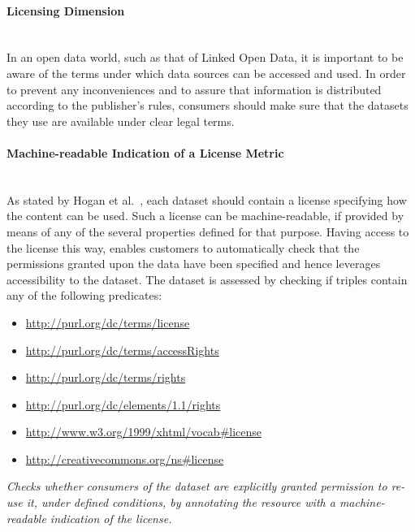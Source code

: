 
\paragraph{Licensing Dimension}~\\ %
In an open data world, such as that of Linked Open Data, it is important to be aware of the terms under which data sources can be accessed and used. In order to prevent any inconveniences and to assure that information is distributed according to the publisher's rules, consumers should make sure that the datasets they use are available under clear legal terms.

\paragraph{Machine-readable Indication of a License Metric} ~\\ %
As stated by Hogan et al.~\cite{Hogan2012:LDC}, each dataset should contain a license specifying how the content can be used. Such a license can be machine-readable, if provided by means of any of the several properties defined for that purpose. Having access to the license this way, enables customers to automatically check that the permissions granted upon the data have been specified and hence leverages accessibility to the dataset.
The dataset is assessed by checking if triples contain any of the following predicates:
\begin{itemize}
\item \url{http://purl.org/dc/terms/license}
\item \url{http://purl.org/dc/terms/accessRights}
\item \url{http://purl.org/dc/terms/rights}
\item \url{http://purl.org/dc/elements/1.1/rights}
\item \url{http://www.w3.org/1999/xhtml/vocab#license}
\item \url{http://creativecommons.org/ns#license}
\end{itemize}

\begin{mdframed}[style=metricdefinition]
\emph{Checks whether consumers of the dataset are explicitly granted permission to re-use it, under defined conditions, by annotating the resource with a machine-readable indication of the license.}
\end{mdframed}

